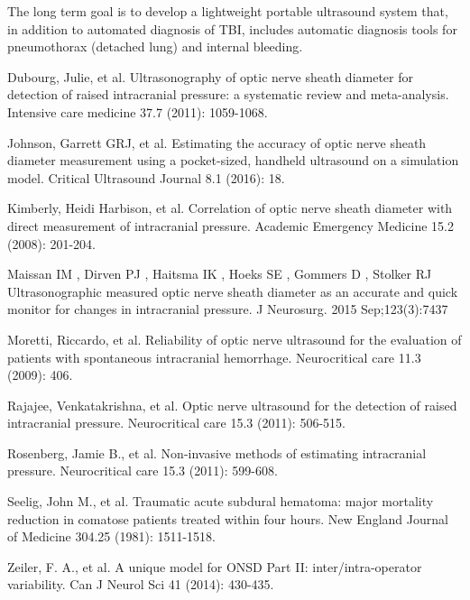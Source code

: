 \documentclass{llncs}
\begin{document}
The long term goal is to develop a lightweight portable ultrasound
system that, in addition to automated diagnosis of TBI, includes automatic
diagnosis tools for pneumothorax (detached lung) and internal bleeding.

%
%
\begin{thebibliography}{}
%
Dubourg, Julie, et al. 
Ultrasonography of optic nerve sheath diameter for detection of raised
intracranial pressure: a systematic review and meta-analysis.
Intensive care medicine 37.7 (2011): 1059-1068.



Johnson, Garrett GRJ, et al. 
Estimating the accuracy of optic nerve sheath diameter measurement using a
pocket-sized, handheld ultrasound on a simulation model.  Critical Ultrasound
Journal 8.1 (2016): 18.

Kimberly, Heidi Harbison, et al. 
Correlation of optic nerve sheath diameter with direct measurement of
intracranial pressure.
Academic Emergency Medicine 15.2 (2008): 201-204.

Maissan IM , Dirven PJ , Haitsma IK , Hoeks SE , Gommers D , Stolker RJ 
Ultrasonographic measured optic nerve sheath diameter as an accurate and quick
monitor for changes in intracranial pressure. 
J Neurosurg. 2015 Sep;123(3):7437

Moretti, Riccardo, et al. 
Reliability of optic nerve ultrasound for the evaluation of patients with
spontaneous intracranial hemorrhage.
Neurocritical care 11.3 (2009): 406.

Rajajee, Venkatakrishna, et al. 
Optic nerve ultrasound for the detection of raised intracranial pressure. 
Neurocritical care 15.3 (2011): 506-515.

Rosenberg, Jamie B., et al. 
Non-invasive methods of estimating intracranial pressure.
Neurocritical care 15.3 (2011): 599-608.

Seelig, John M., et al. 
Traumatic acute subdural hematoma: major mortality reduction in comatose
patients treated within four hours.
New England Journal of Medicine 304.25 (1981): 1511-1518.

Zeiler, F. A., et al. 
A unique model for ONSD Part II: inter/intra-operator variability. 
Can J Neurol Sci 41 (2014): 430-435.



\end{thebibliography}
\end{document}
